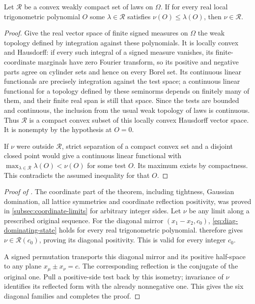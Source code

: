 \begin{lemma}\label{lem:diag-separation}
Let $\mathcal R$ be a convex weakly compact set of laws on
$\Omega$. If for every real local trigonometric polynomial
$O$ some $\lambda\in\mathcal R$ satisfies
$\nu(O)\le\lambda(O)$, then $\nu\in\mathcal R$.
\end{lemma}

\begin{proof}
Give the real vector space of finite signed measures on
$\Omega$ the weak topology defined by integration against
these polynomials. It is locally convex and Hausdorff:
if every such integral of a signed measure vanishes, its
finite-coordinate marginals have zero Fourier transform,
so its positive and negative parts agree on cylinder sets
and hence on every Borel set. Its continuous linear
functionals are precisely integration against the test
space; a continuous linear functional for a topology
defined by these seminorms depends on finitely many of
them, and their finite real span is still that space.
Since the tests are bounded and continuous, the inclusion
from the usual weak topology of laws is continuous.
Thus $\mathcal R$ is a compact convex subset of this
locally convex Hausdorff vector space. It is nonempty
by the hypothesis at $O=0$.

If $\nu$ were outside $\mathcal R$, strict separation
\cite[Theorem~6.2.9]{Peterson2017} of
a compact convex set and a disjoint closed point would
give a continuous linear functional with
$\max_{\lambda\in\mathcal R}\lambda(O)<\nu(O)$ for some
test $O$. Its maximum exists by compactness. This contradicts
the assumed inequality for that $O$.
\end{proof}

\begin{proof}[Proof of ]

The coordinate part of the theorem, including tightness, Gaussian
domination, all lattice symmetries and coordinate reflection positivity,
was proved in \cref{subsec:coordinate-limits} for arbitrary integer
sides. Let $\nu$ be any limit along a prescribed original sequence.
For the diagonal mirror $(x_1-x_2,c_0)$,
\eqref{eq:diag-dominating-state} holds for every real
trigonometric polynomial. 
therefore gives $\nu\in\mathcal R(c_0)$, proving its
diagonal positivity. This is valid for every integer
$c_0$.

A signed permutation transports this diagonal mirror
and its positive half-space to any plane
$x_\mu\pm x_\nu=c$. The corresponding reflection is the
conjugate of the original one. Pull a positive-side test
back by this isometry; invariance of $\nu$ identifies
its reflected form with the already nonnegative one.
This gives the six diagonal families and completes
the proof.
\end{proof}

